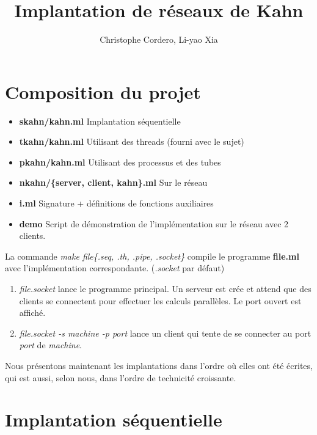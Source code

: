 \documentclass[11pt]{article}
\begin{document}
\title{Implantation de r\'eseaux de Kahn}

\author{Christophe Cordero, Li-yao Xia}

\maketitle

\section{Composition du projet}

\begin{itemize}
  \item {\bf skahn/kahn.ml} Implantation s\'equentielle
  \item {\bf tkahn/kahn.ml} Utilisant des threads (fourni avec le sujet)
  \item {\bf pkahn/kahn.ml} Utilisant des processus et des tubes
  \item {\bf nkahn/\{server, client, kahn\}.ml} Sur le r\'eseau
  \item {\bf i.ml} Signature + d\'efinitions de fonctions auxiliaires
  \item {\bf demo} Script de d\'emonstration de l'impl\'ementation
    sur le r\'eseau avec 2 clients.
\end{itemize}

La commande {\it make file\{.seq, .th, .pipe, .socket\}}
compile le programme {\bf file.ml} avec l'impl\'ementation correspondante.
({\it .socket} par d\'efaut)

\smallskip

\begin{enumerate}
  \item {\it file.socket} lance le programme principal.
    Un serveur est cr\'ee et attend que des clients se connectent pour
    effectuer les calculs parall\`eles. Le port ouvert est affich\'e.
  \item {\it file.socket -s machine -p port} lance un client
    qui tente de se connecter au port {\it port} de {\it machine}.
\end{enumerate}

\smallskip

Nous pr\'esentons maintenant les implantations dans l'ordre
o\`u elles ont \'et\'e \'ecrites, qui est aussi, selon nous, dans l'ordre de technicit\'e croissante.

\section{Implantation s\'equentielle}
\end{document}

